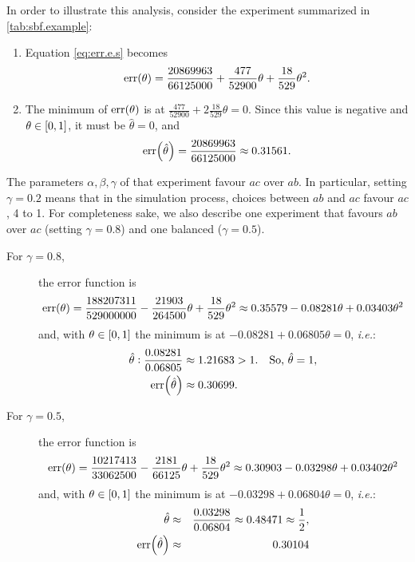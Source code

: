 \documentclass[a4paper, 10pt]{article}
\newcommand{\at}[1]{\ensuremath{\!\del{#1}}}
\newcommand{\err}[1]{\ensuremath{\mathrm{err}\at{#1}}}
\begin{document}
In order to illustrate this analysis, consider the experiment summarized in \cref{tab:sbf.example}:

\begin{enumerate}
    \item Equation \eqref{eq:err.e.s} becomes
          $$
              \err{\theta} = \frac{20869963}{66125000} + \frac{477}{52900}\theta + \frac{18}{529}\theta^2.
          $$
    \item The minimum of $\err{\theta}$ is at $\frac{477}{52900} + 2\frac{18}{529}\theta = 0$. Since this value is negative and $\theta \in \intcc{0,1}$, it must be $\hat{\theta} = 0$, and
          $$
              \err{\hat{\theta}} = \frac{20869963}{66125000} \approx 0.31561.
          $$
\end{enumerate}

The parameters $\alpha, \beta, \gamma$ of that experiment favour $ac$ over $ab$. In particular, setting $\gamma = 0.2$ means that in the simulation process, choices between $ab$ and $ac$ favour $ac$, 4 to 1. For completeness sake, we also describe one experiment that favours $ab$ over $ac$ (setting $\gamma=0.8$) and one balanced ($\gamma=0.5$).

\begin{description}
    \item[For $\gamma=0.8$,] the error function is
          \begin{equation*}
              \err{\theta} = \frac{188207311}{529000000} - \frac{21903}{264500} \theta + \frac{18}{529} \theta^{2} \approx 0.35579 - 0.08281 \theta + 0.03403 \theta ^2
          \end{equation*}
          and, with $\theta\in\intcc{0, 1}$ the minimum is at $-0.08281 + 0.06805 \theta = 0$, \emph{i.e.}:
          \begin{eqnarray*}
              \hat{\theta} :              \frac{0.08281}{0.06805} \approx 1.21683& >1. &\text{So,~} \hat{\theta} = 1, \\
              \err{\hat{\theta}} \approx  0.30699&.
          \end{eqnarray*}

    \item[For $\gamma=0.5$,] the error function is
          \begin{equation*}
              \err{\theta} = \frac{10217413}{33062500} - \frac{2181}{66125} \theta + \frac{18}{529} \theta^{2}\approx 0.30903 - 0.03298 \theta + 0.03402 \theta ^2
          \end{equation*}
          and, with $\theta\in\intcc{0, 1}$ the minimum is at $-0.03298 + 0.06804 \theta = 0$, \emph{i.e.}:
          \begin{eqnarray*}
              \hat{\theta}        &\approx &
              \frac{0.03298}{0.06804}
              \approx 0.48471
              \approx \frac{1}{2}, \\
              \err{\hat{\theta}}  &\approx &
              0.30104
          \end{eqnarray*}

\end{description}
\end{document}
